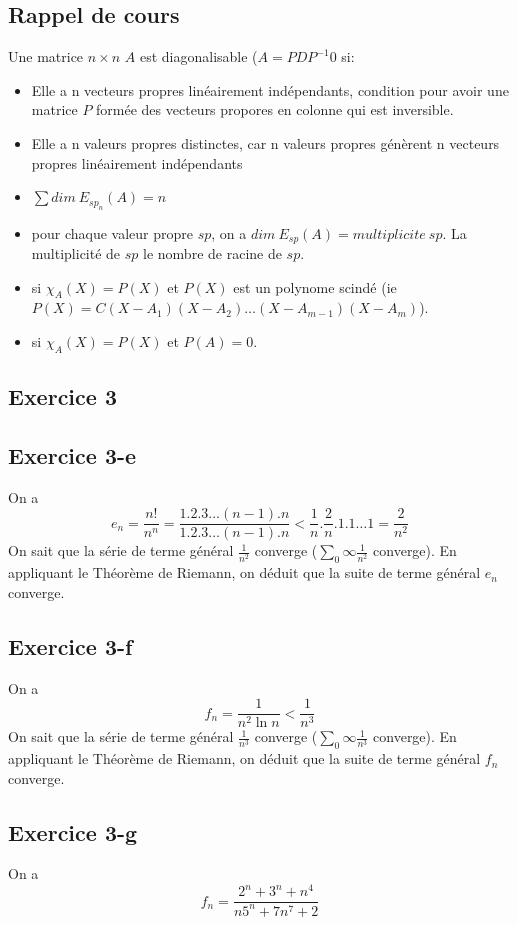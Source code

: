 \documentclass[]{book}
\theoremstyle{definition}
\begin{document}
\subsection*{Rappel de cours}
Une matrice $n \times n$ $A$ est diagonalisable ($A = PDP^{-1}$0 si:
\begin{itemize}
\item Elle a n vecteurs propres lin\'eairement ind\'ependants, condition pour avoir une matrice $P$ form\'ee des vecteurs propores en colonne qui est inversible. 
\item Elle a n valeurs propres distinctes, car n valeurs propres g\'en\`erent n vecteurs propres lin\'eairement ind\'ependants
\item $\sum{dim\ E_{sp_n}(A)} = n$
\item pour chaque valeur propre $sp$, on a $dim\ E_{sp}(A) = multiplicite\ sp$. La multiplicit\'e de $sp$ le nombre de racine de $sp$.
\item si $\chi_{A}(X) = P(X)$ et $P(X)$ est un polynome scind\'e (ie $P(X) = C(X-A_1)(X-A_2)\ldots(X-A_{m-1})(X-A_m)$).
\item si $\chi_{A}(X) = P(X)$ et $P(A)=0$.
\end{itemize}


\newpage
\subsection*{Exercice 3}
\subsection*{Exercice 3-e}
On a 
$$e_n = \frac{n!}{n^n} = \frac{1.2.3 \ldots (n-1).n}{1.2.3 \ldots (n-1).n} < \frac{1}{n}.\frac{2}{n}.1.1\ldots 1 = \frac{2}{n^2}$$
On sait que la s\'erie de terme g\'en\'eral $\frac{1}{n^2}$ converge ($\sum_{0}{\infty}{\frac{1}{n^2}}$ converge). En appliquant le Th\'eor\`eme de Riemann, on d\'eduit que la suite de terme g\'en\'eral $e_n$ converge.

\subsection*{Exercice 3-f}
On a 
$$f_n = \frac{1}{n^2 \ln n} < \frac{1}{n^3}$$
On sait que la s\'erie de terme g\'en\'eral $\frac{1}{n^3}$ converge ($\sum_{0}{\infty}{\frac{1}{n^3}}$ converge). En appliquant le Th\'eor\`eme de Riemann, on d\'eduit que la suite de terme g\'en\'eral $f_n$ converge.

\subsection*{Exercice 3-g}
On a 
$$f_n = \frac{2^n+3^n+n^4}{n5^n+7n^7+2}$$
\end{document}
